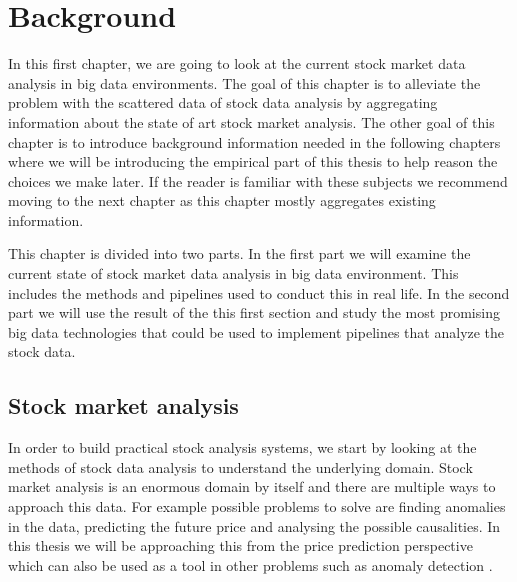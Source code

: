 \chapter{Background}
\label{chapter:background} 

In this first chapter, we are going to look at the current stock market data analysis in big data environments.
The goal of this chapter is to alleviate the problem with the scattered data of stock data analysis by aggregating information about the state of art stock market analysis.
The other goal of this chapter is to introduce background information needed in the following chapters where we will be introducing the empirical part of this thesis to help reason the choices we make later.
If the reader is familiar with these subjects we recommend moving to the next chapter as this chapter mostly aggregates existing information.

This chapter is divided into two parts.
In the first part we will examine the current state of stock market data analysis in big data environment.
This includes the methods and pipelines used to conduct this in real life.
In the second part we will use the result of the this first section and study the most promising big data technologies that could be used to implement pipelines that analyze the stock data.



\section{Stock market analysis}

In order to build practical stock analysis systems, we start by looking at the methods of stock data analysis to understand the underlying domain.
Stock market analysis is an enormous domain by itself and there are multiple ways to approach this data.
For example possible problems to solve are finding anomalies in the data, predicting the future price and analysing the possible causalities.
In this thesis we will be approaching this from the price prediction perspective which can also be used as a tool in other problems such as anomaly detection \cite{islam}.

